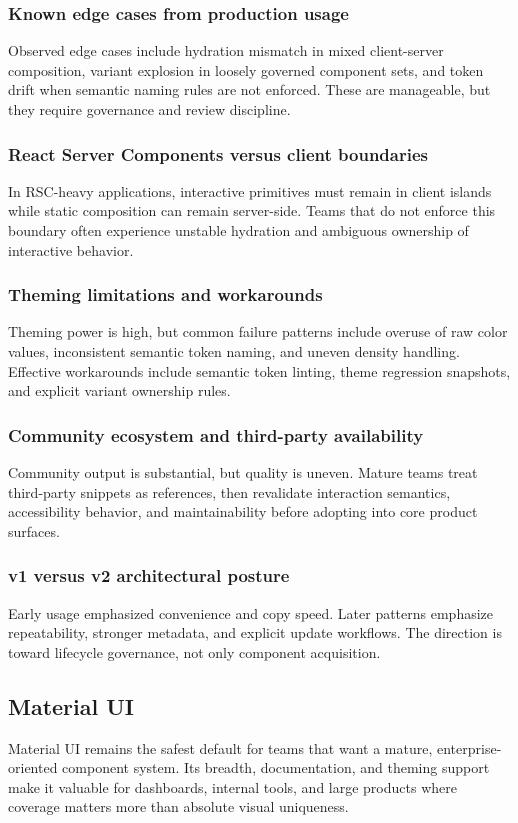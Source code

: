\documentclass[11pt,twoside,a4paper]{article}
\begin{document}
\subsubsection{Known edge cases from production usage}
Observed edge cases include hydration mismatch in mixed client-server composition, variant explosion in loosely governed component sets, and token drift when semantic naming rules are not enforced. These are manageable, but they require governance and review discipline.

\subsubsection{React Server Components versus client boundaries}
In RSC-heavy applications, interactive primitives must remain in client islands while static composition can remain server-side. Teams that do not enforce this boundary often experience unstable hydration and ambiguous ownership of interactive behavior.

\subsubsection{Theming limitations and workarounds}
Theming power is high, but common failure patterns include overuse of raw color values, inconsistent semantic token naming, and uneven density handling. Effective workarounds include semantic token linting, theme regression snapshots, and explicit variant ownership rules.

\subsubsection{Community ecosystem and third-party availability}
Community output is substantial, but quality is uneven. Mature teams treat third-party snippets as references, then revalidate interaction semantics, accessibility behavior, and maintainability before adopting into core product surfaces.

\subsubsection{v1 versus v2 architectural posture}
Early usage emphasized convenience and copy speed. Later patterns emphasize repeatability, stronger metadata, and explicit update workflows. The direction is toward lifecycle governance, not only component acquisition.

\subsection{Material UI}
Material UI remains the safest default for teams that want a mature, enterprise-oriented component system. Its breadth, documentation, and theming support make it valuable for dashboards, internal tools, and large products where coverage matters more than absolute visual uniqueness.
\end{document}

